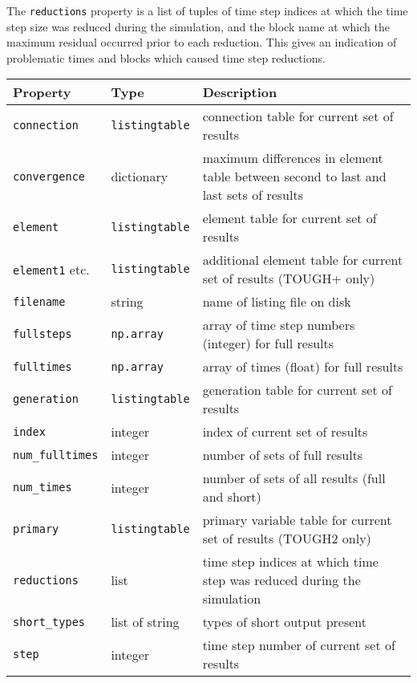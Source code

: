 The \texttt{reductions} property is a list of tuples of time step indices at which the time step size was reduced during the simulation, and the block name at which the maximum residual occurred prior to each reduction.  This gives an indication of problematic times and blocks which caused time step reductions.

\begin{table}
  \begin{center}
    \begin{tabular}{|l|l|p{70mm}|}
      \hline
      \textbf{Property} & \textbf{Type} & \textbf{Description}\\
      \hline
      \texttt{connection} & \texttt{listingtable} & connection table for current set of results\\
      \texttt{convergence} & dictionary & maximum differences in element table between second to last and last sets of results\\
      \texttt{element} & \texttt{listingtable} & element table for current set of results\\
      \texttt{element1} etc. & \texttt{listingtable} & additional element table for current set of results (TOUGH+ only)\\
      \texttt{filename} & string & name of listing file on disk\\
      \texttt{fullsteps} & \texttt{np.array} & array of time step numbers (integer) for full results\\
      \texttt{fulltimes} & \texttt{np.array} & array of times (float) for full results\\
      \texttt{generation} & \texttt{listingtable} & generation table for current set of results\\
      \texttt{index} & integer & index of current set of results\\
      \texttt{num\_fulltimes} & integer & number of sets of full results\\
      \texttt{num\_times} & integer & number of sets of all results (full and short)\\
      \texttt{primary} & \texttt{listingtable} & primary variable table for current set of results (TOUGH2 only)\\
      \texttt{reductions} & list & time step indices at which time step was reduced during the simulation\\
      \texttt{short\_types} & list of string & types of short output present\\
      \texttt{step} & integer & time step number of current set of results\\

\end{tabular}
\end{center}
\end{table}

